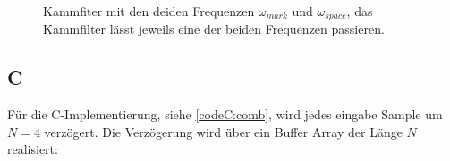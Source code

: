 \documentclass{article}
\begin{document}
\begin{figure}[!h]
    \label{fig:comb}
    \centering
    \def\svgscale{0.3}
    \def\svgwidth{0.8\columnwidth}
    \caption{Kammfiter mit den deiden Frequenzen $\omega_{mark}$ und $\omega_{space}$, das Kammfilter lässt jeweils eine der beiden Frequenzen passieren.}
\end{figure}
\subsection{C}
Für die C-Implementierung, siehe \ref{codeC:comb}, wird jedes eingabe Sample um $N = 4$ verzögert.
Die Verzögerung wird über ein Buffer Array der Länge $N$ realisiert:
% 
%
%
%            
%
\end{document}
